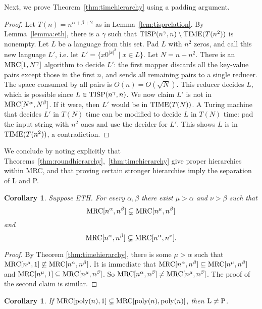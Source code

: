 \documentclass[11pt]{article}
\newtheorem{corollary}[theorem]{Corollary}
\theoremstyle{definition}
\theoremstyle{remark}
\newcommand{\mrc}{\textup{MRC}}
\newcommand{\TIME}{\textup{TIME}}
\newcommand{\TISP}{\textup{TISP}}
\renewcommand{\P}{\textup{P}}
\renewcommand{\L}{\textup{L}}
\begin{document}
Next, we prove Theorem~\ref{thm:timehierarchy} using a padding argument.

\begin{proof}
Let $T(n) = n^{\alpha + \beta + 2}$ as in Lemma~\ref{lem:tisprelation}. By
Lemma~\ref{lemma:eth}, there is a $\gamma$ such that $\TISP(n^\gamma,
n)\setminus\TIME(T(n^{2}))$ is nonempty.  Let $L$ be a language from this set.
Pad $L$ with $n^{2}$ zeros, and call this new language $L'$, i.e. let $L' = \{x
0^{|x|^{2}} \mid x \in  L\}$. Let $N = n + n^{2}$. There is an $\mrc[1,
N^\gamma]$ algorithm to decide $L'$: the first mapper discards all the
key-value pairs except those in the first $n$, and sends all remaining pairs to
a single reducer. The space consumed by all pairs is $O(n) = O(\sqrt{N})$. This
reducer decides $L$, which is possible since $L \in \TISP(n^\gamma, n)$. We now
claim $L'$ is not in $\mrc[N^\alpha, N^\beta]$. If it were, then $L'$ would be
in $\TIME(T(N))$. A Turing machine that decides $L'$ in $T(N)$ time can be
modified to decide $L$ in $T(N)$ time: pad the input string with $n^{2}$ ones
and use the decider for $L'$. This shows $L$ is in $\TIME(T(n^{2}))$, a
contradiction.  \end{proof}

We conclude by noting explicitly that
Theorems~\ref{thm:roundhierarchy},~\ref{thm:timehierarchy} give proper
hierarchies within MRC, and that proving certain stronger hierarchies imply the
separation of L and P.

\begin{corollary} \label{cor:mrchierarchy}
Suppose ETH. For every $\alpha, \beta$ there exist $\mu>\alpha$ and $\nu>\beta$
such that $$\mrc[n^\alpha, n^\beta] \subsetneq \mrc[n^\mu, n^\beta]$$ and
$$\mrc[n^\alpha, n^\beta] \subsetneq \mrc[n^\alpha, n^\nu].$$
\end{corollary}

\begin{proof}
By Theorem \ref{thm:timehierarchy}, there is some $\mu > \alpha$ such that
$\mrc[n^\mu, 1] \not\subseteq \mrc[n^\alpha, n^\beta]$.  It is immediate that
$\mrc[n^\alpha, n^\beta] \subseteq \mrc[n^\mu, n^\beta]$ and
$\mrc[n^\mu,1]\subseteq\mrc[n^\mu,n^\beta]$.  So $\mrc[n^\alpha,n^\beta]\neq
\mrc[n^\mu, n^\beta]$.  The proof of the second claim is similar.
\end{proof}


\begin{corollary} \label{cor:lvsp}
If $\mrc[\textup{poly}(n), 1] \subsetneq \mrc[\textup{poly}(n),
\textup{poly}(n)]$, then $\L \neq \P$.
\end{corollary}
\end{document}
